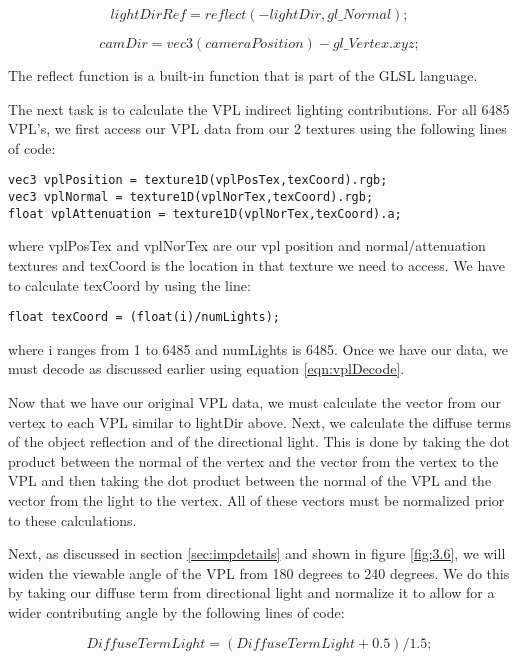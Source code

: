 \begin{equation}
lightDirRef = reflect(-lightDir, gl\_Normal);
\end{equation}


\begin{equation}
camDir = vec3(cameraPosition) - gl\_Vertex.xyz;
\end{equation}

The reflect function is a built-in function that is part of the GLSL language.  

The next task is to calculate the VPL indirect lighting contributions.  For all 6485 VPL's, we first access our VPL data from our 2 textures using the following lines of code:


\begin{lstlisting}
vec3 vplPosition = texture1D(vplPosTex,texCoord).rgb;
vec3 vplNormal = texture1D(vplNorTex,texCoord).rgb;
float vplAttenuation = texture1D(vplNorTex,texCoord).a;
\end{lstlisting}

where vplPosTex and vplNorTex are our vpl position and normal/attenuation textures and texCoord is the location in that texture we need to access.  We have to calculate texCoord by using the line:


\begin{lstlisting}
float texCoord = (float(i)/numLights);
\end{lstlisting}

where i ranges from 1 to 6485 and numLights is 6485.  Once we have our data, we must decode as discussed earlier using equation \ref{eqn:vplDecode}.  

Now that we have our original VPL data, we must calculate the vector from our vertex to each VPL similar to lightDir above.  Next, we calculate the diffuse terms of the object reflection and of the directional light.  This is done by taking the dot product between the normal of the vertex and the vector from the vertex to the VPL and then taking the dot product between the normal of the VPL and the vector from the light to the vertex.  All of these vectors must be normalized prior to these calculations.

Next, as discussed in section \ref{sec:impdetails} and shown in figure \ref{fig:3.6}, we will widen the viewable angle of the VPL from 180 degrees to 240 degrees.  We do this by taking our diffuse term from directional light and normalize it to allow for a wider contributing angle by the following lines of code:


\begin{equation}
DiffuseTermLight = (DiffuseTermLight + 0.5)/1.5;
\end{equation}

